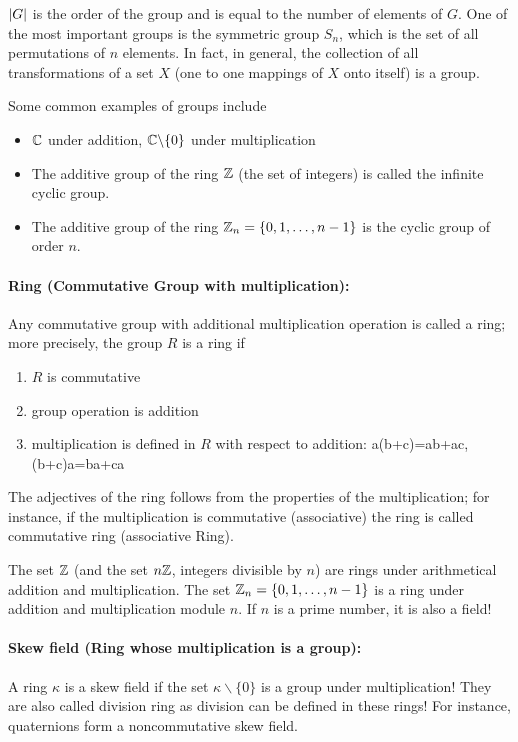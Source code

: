 \documentclass[12pt]{article}
\numberwithin{equation}{section}
\begin{document}
$\abs{G}$ is the order of the group and is equal to the number of elements of $G$. One of the most important groups is the symmetric group  $S_n$, which is the set of all permutations of $n$ elements. In fact, in general, the collection of all transformations of a set $X$ (one to one mappings of $X$ onto itself) is a group.

Some common examples of groups include
\begin{itemize}
	\item $\mathbb{C}$ under addition, $\mathbb{C}\backslash\{0\}$ under multiplication
	\item The additive group of the ring $\mathbb{Z}$ (the set of integers) is called the infinite cyclic group.
	\item The additive group of the ring $\mathbb{Z}_n=\{0,1,\dots,n-1\}$ is the cyclic group of order $n$.
\end{itemize}

\paragraph{Ring (Commutative Group with multiplication):} Any commutative group with additional multiplication operation is called a ring; more precisely, the group $R$ is a ring if
\begin{enumerate}
	\item $R$ is commutative
	\item group operation is addition
	\item multiplication is defined in $R$ with respect to addition:
	\be 
	a(b+c)=ab+ac\;,(b+c)a=ba+ca
	\ee 
\end{enumerate}
The adjectives of the ring follows from the properties of the multiplication; for instance, if the multiplication is commutative (associative) the ring is called commutative ring (associative Ring).

The set $\mathbb{Z}$ (and the set $n\mathbb{Z}$, integers divisible by $n$) are rings under arithmetical addition and multiplication. The set $\mathbb{Z}_n=\{0,1,\dots,n-1\}$ is a ring under addition and multiplication module $n$. If $n$ is a prime number, it is also a field!

\paragraph{Skew field (Ring whose multiplication is a group):}  A ring $\kappa$ is a skew field if the set $\kappa\backslash \{0\}$ is a group under multiplication! They are also called division ring as division can be defined in these rings! For instance, quaternions form a noncommutative skew field. 
\end{document}
